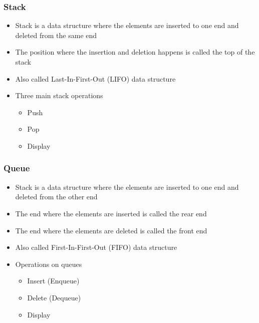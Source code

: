\documentclass[11pt]{beamer}
\begin{document}
\begin{frame}[fragile]\frametitle{Stack}
\label{sec-1-25}

\begin{itemize}
\item Stack is a data structure where the elements are inserted to one end and deleted from the same end
\item The position where the insertion and deletion happens is called the top of the stack
\item Also called Last-In-First-Out (LIFO) data structure
\item Three main stack operations
\begin{itemize}
\item Push
\item Pop
\item Display
\end{itemize}
\end{itemize}
\end{frame}
\begin{frame}[fragile]\frametitle{Queue}
\label{sec-1-26}

\begin{itemize}
\item Stack is a data structure where the elements are inserted to one end and deleted from the other end
\item The end where the elements are inserted is called the rear end
\item The end where the elements are deleted is called the front end
\item Also called First-In-First-Out (FIFO) data structure
\item Operations on queues
\begin{itemize}
\item Insert (Enqueue)
\item Delete (Dequeue)
\item Display
\end{itemize}
\end{itemize}
\end{frame}
\end{document}
